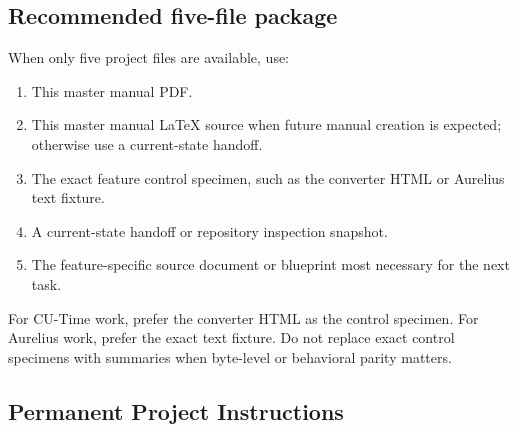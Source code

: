 \documentclass[11pt,letterpaper]{article}
\begin{document}
\subsection{Recommended five-file package}

When only five project files are available, use:

\begin{enumerate}
    \item This master manual PDF.
    \item This master manual \LaTeX{} source when future manual creation is
          expected; otherwise use a current-state handoff.
    \item The exact feature control specimen, such as the converter HTML or
          Aurelius text fixture.
    \item A current-state handoff or repository inspection snapshot.
    \item The feature-specific source document or blueprint most necessary for
          the next task.
\end{enumerate}

For CU-Time work, prefer the converter HTML as the control specimen. For
Aurelius work, prefer the exact text fixture. Do not replace exact control
specimens with summaries when byte-level or behavioral parity matters.

\subsection{Permanent Project Instructions}
\end{document}
